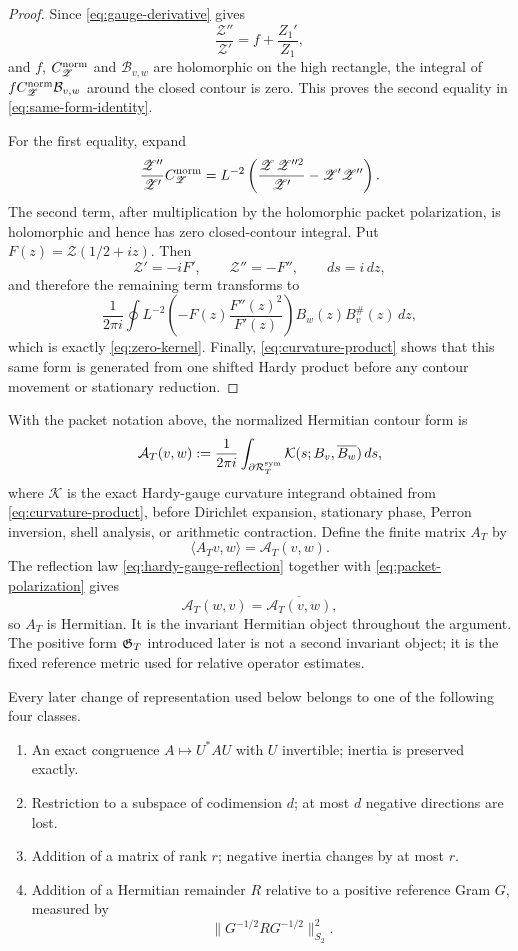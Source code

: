 \begin{proof}
Since \eqref{eq:gauge-derivative} gives
\[
\frac{\mathscr Z''}{\mathscr Z'}
=f+\frac{Z_1'}{Z_1},
\]
and $f$, $C_{\mathscr Z}^{\rm norm}$ and $\mathcal B_{v,w}$ are holomorphic on the
high rectangle, the integral of
$fC_{\mathscr Z}^{\rm norm}\mathcal B_{v,w}$ around the closed contour is zero. This proves
the second equality in \eqref{eq:same-form-identity}.

For the first equality, expand
\[
\frac{\mathscr Z''}{\mathscr Z'}C_{\mathscr Z}^{\rm norm}
=L^{-2}\left(
\frac{\mathscr Z\,\mathscr Z''^2}{\mathscr Z'}
-\mathscr Z'\mathscr Z''\right).
\]
The second term, after multiplication by the holomorphic packet polarization,
is holomorphic and hence has zero closed-contour integral. Put
$F(z)=\mathscr Z(1/2+iz)$. Then
\[
\mathscr Z'=-iF',\qquad \mathscr Z''=-F'',\qquad ds=i\,dz,
\]
and therefore the remaining term transforms to
\[
\frac1{2\pi i}\oint
L^{-2}\left(-F(z)\frac{F''(z)^2}{F'(z)}\right)
 B_w(z)B_v^\#(z)\,dz,
\]
which is exactly \eqref{eq:zero-kernel}. Finally, \eqref{eq:curvature-product}
shows that this same form is generated from one shifted Hardy product before
any contour movement or stationary reduction.
\end{proof}

With the packet notation above, the normalized Hermitian contour form is
\begin{equation}
\mathcal A_T(v,w)
:=\frac1{2\pi i}\int_{\partial\mathcal R_T^{\rm sym}}
\mathcal K(s;B_v,\overline{B_w})\,ds,
\label{eq:contour-form}
\end{equation}
where $\mathcal K$ is the exact Hardy-gauge curvature integrand obtained from
\eqref{eq:curvature-product}, before Dirichlet expansion, stationary phase,
Perron inversion, shell analysis, or arithmetic contraction. Define the finite matrix $A_T$ by
\[
\langle A_Tv,w\rangle=\mathcal A_T(v,w).
\]
The reflection law \eqref{eq:hardy-gauge-reflection} together with
\eqref{eq:packet-polarization} gives
\[
\mathcal A_T(w,v)=\overline{\mathcal A_T(v,w)},
\]
so $A_T$ is Hermitian. It is the invariant Hermitian object throughout the
argument. The positive form $\mathfrak G_T$ introduced later is not a second invariant
object; it is the fixed reference metric used for relative operator estimates.

\begin{lemma}
\label{lem:allowed}
Every later change of representation used below belongs to one of the
following four classes.
\begin{enumerate}[label=(\roman*)]
\item An exact congruence $A\mapsto U^*AU$ with $U$ invertible; inertia is
preserved exactly.
\item Restriction to a subspace of codimension $d$; at most $d$ negative
directions are lost.
\item Addition of a matrix of rank $r$; negative inertia changes by at most
$r$.
\item Addition of a Hermitian remainder $R$ relative to a positive reference
Gram $G$, measured by
\[
\|G^{-1/2}RG^{-1/2}\|_{S_2}^2.
\]
\end{enumerate}
\end{lemma}

